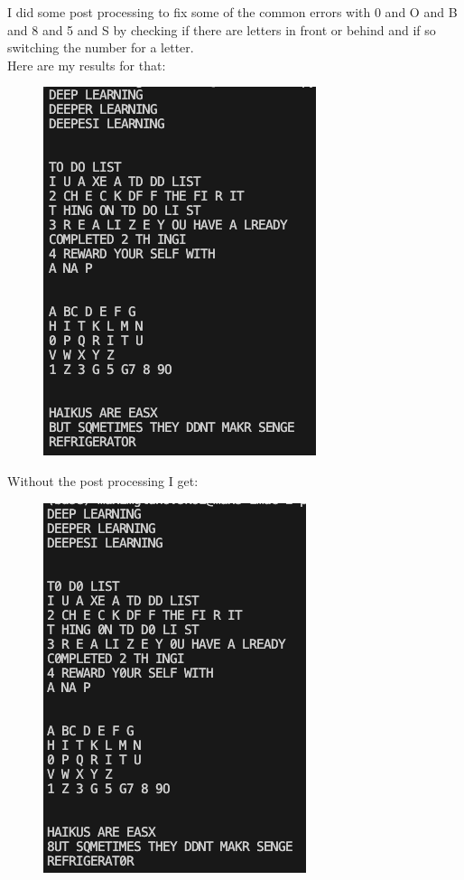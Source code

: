 \documentclass{article}
\begin{document}
I did some post processing to fix some of the common errors with 0 and O and B and 8 and 5 and S by checking if there 
are letters in front or behind and if so switching the number for a letter.\\
Here are my results for that:\\
\begin{figure}[htbp]
    \centering
    \includegraphics[width=0.6\linewidth]{final_res1.png}
\end{figure}
\newpage
Without the post processing I get:
\begin{figure}[htbp]
    \centering
    \includegraphics[width=0.6\linewidth]{final_res2.png}
\end{figure}
\end{document}
